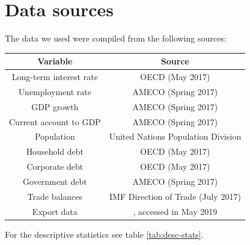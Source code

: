\documentclass[11pt,a4paper]{article}
\begin{document}
\newpage

\appendix
\section{Data sources}
\label{ap:data}
The data we used were compiled from the following sources:

\begin{center}
\begin{tabular}{ c c }
\toprule
\textbf{Variable} & \textbf{Source} \\ 
\midrule 
Long-term interest rate & OECD (May 2017) \\
Unemployment rate & AMECO (Spring 2017)\\
GDP growth & AMECO (Spring 2017)\\
Current account to GDP & AMECO (Spring 2017)\\
Population & United Nations Population Division\\
Household debt & OECD (May 2017)\\
Corporate debt & OECD (May 2017)\\
Government debt & AMECO (Spring 2017)\\
Trade balances & IMF Direction of Trade (July 2017)\\
Export data & \citet{AtlasData}, accessed in May 2019\\
\bottomrule
\end{tabular} 
\end{center}

For the descriptive statistics see table \ref{tab:desc-stats}.
\end{document}
